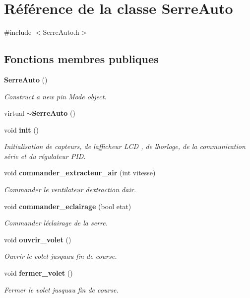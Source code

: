 \section{Référence de la classe Serre\+Auto}
\label{class_serre_auto}


{\ttfamily \#include $<$Serre\+Auto.\+h$>$}

\subsection*{Fonctions membres publiques}
\begin{DoxyCompactItemize}
\item 
\textbf{ Serre\+Auto} ()
\begin{DoxyCompactList}\small\item\em Construct a new pin Mode object. \end{DoxyCompactList}\item 
virtual \textbf{ $\sim$\+Serre\+Auto} ()
\item 
void \textbf{ init} ()
\begin{DoxyCompactList}\small\item\em Initialisation de capteurs, de l\textquotesingle{}afficheur L\+CD , de l\textquotesingle{}horloge, de la communication série et du régulateur P\+ID. \end{DoxyCompactList}\item 
void \textbf{ commander\+\_\+extracteur\+\_\+air} (int vitesse)
\begin{DoxyCompactList}\small\item\em Commander le ventilateur d\textquotesingle{}extraction d\textquotesingle{}air. \end{DoxyCompactList}\item 
void \textbf{ commander\+\_\+eclairage} (bool etat)
\begin{DoxyCompactList}\small\item\em Commander l\textquotesingle{}éclairage de la serre. \end{DoxyCompactList}\item 
void \textbf{ ouvrir\+\_\+volet} ()
\begin{DoxyCompactList}\small\item\em Ouvrir le volet jusqu\textquotesingle{}au fin de course. \end{DoxyCompactList}\item 
void \textbf{ fermer\+\_\+volet} ()
\begin{DoxyCompactList}\small\item\em Fermer le volet jusqu\textquotesingle{}au fin de course. \end{DoxyCompactList}\item 

\end{DoxyCompactItemize}

